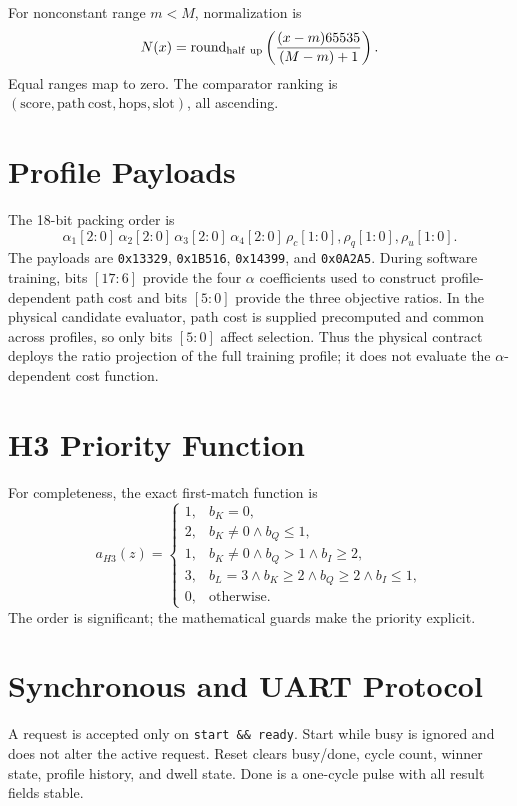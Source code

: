 For nonconstant range $m<M$, normalization is
\begin{equation}
N(x)=\operatorname{round}_{\rm half\ up}
\left(\frac{(x-m)65535}{(M-m)+1}\right).
\end{equation}
Equal ranges map to zero. The comparator ranking is
$(\mathrm{score},\mathrm{path\ cost},\mathrm{hops},\mathrm{slot})$, all ascending.

\section{Profile Payloads}

The 18-bit packing order is
\[
\alpha_1[2{:}0]\,\alpha_2[2{:}0]\,\alpha_3[2{:}0]\,\alpha_4[2{:}0]\,
\rho_c[1{:}0],\rho_q[1{:}0],\rho_u[1{:}0].
\]
The payloads are \texttt{0x13329}, \texttt{0x1B516}, \texttt{0x14399}, and
\texttt{0x0A2A5}. During software training, bits $[17{:}6]$ provide the four
$\alpha$ coefficients used to construct profile-dependent path cost and bits
$[5{:}0]$ provide the three objective ratios. In the physical candidate evaluator,
path cost is supplied precomputed and common across profiles, so only bits $[5{:}0]$
affect selection. Thus the physical contract deploys the ratio projection of the
full training profile; it does not evaluate the $\alpha$-dependent cost function.

\section{H3 Priority Function}

For completeness, the exact first-match function is
\begin{equation}
a_{H3}(z)=\begin{cases}
1,&b_K=0,\\
2,&b_K\ne0\land b_Q\le1,\\
1,&b_K\ne0\land b_Q>1\land b_I\ge2,\\
3,&b_L=3\land b_K\ge2\land b_Q\ge2\land b_I\le1,\\
0,&\text{otherwise}.
\end{cases}
\end{equation}
The order is significant; the mathematical guards make the priority explicit.

\section{Synchronous and UART Protocol}

A request is accepted only on \texttt{start \&\& ready}. Start while busy is
ignored and does not alter the active request. Reset clears busy/done, cycle count,
winner state, profile history, and dwell state. Done is a one-cycle pulse with all
result fields stable.

